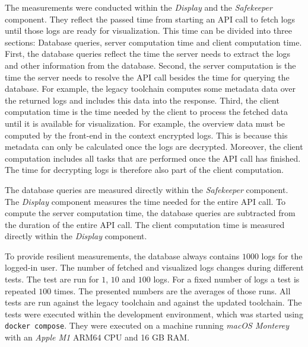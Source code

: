 \documentclass[../main.tex]{subfiles}
\begin{document}
The measurements were conducted within the \emph{Display} and the \emph{Safekeeper} component.
They reflect the passed time from starting an API call to fetch logs until those logs are ready for visualization.
This time can be divided into three sections: Database queries, server computation time and client computation time.
First, the database queries reflect the time the server needs to extract the logs and other information from the database.
Second, the server computation is the time the server needs to resolve the API call besides the time for querying the database.
For example, the legacy toolchain computes some metadata data over the returned logs and includes this data into the response.
Third, the client computation time is the time needed by the client to process the fetched data until it is available for visualization.
For example, the overview data must be computed by the front-end in the context encrypted logs.
This is because this metadata can only be calculated once the logs are decrypted.
Moreover, the client computation includes all tasks that are performed once the API call has finished.
The time for decrypting logs is therefore also part of the client computation.

The database queries are measured directly within the \emph{Safekeeper} component.
The \emph{Display} component measures the time needed for the entire API call.
To compute the server computation time, the database queries are subtracted from the duration of the entire API call.
The client computation time is measured directly within the \emph{Display} component.

To provide resilient measurements, the database always contains $1000$ logs for the logged-in user.
The number of fetched and visualized logs changes during different tests.
The test are run for $1$, $10$ and $100$ logs.
For a fixed number of logs a test is repeated $100$ times.
The presented numbers are the averages of those runs.
All tests are run against the legacy toolchain and against the updated toolchain.
The tests were executed within the development environment, which was started using \verb|docker compose|.
They were executed on a machine running \emph{macOS Monterey} with an \emph{Apple M1} ARM64 CPU and 16 GB RAM.
\end{document}
